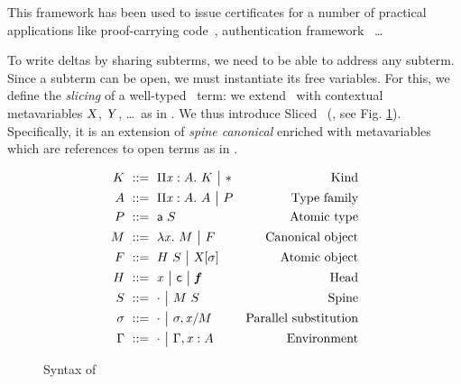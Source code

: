 \documentclass{llncs}
\begin{document}
This framework has been used to issue certificates for a number of
practical applications like proof-carrying
code~\cite{necula1997proof}, authentication
framework~\cite{appel1999proof} \ldots %

To write deltas by sharing subterms, we need to be able to address any
subterm. Since a subterm can be open, we must instantiate its free
variables. For this, we define the \emph{slicing} of a well-typed \LF\
term: we extend \LF\ with contextual metavariables $\text{\textsl{X}}$, $\text{\textsl{Y}}$, \ldots\ as in \cite{nanevski2008contextual}. We thus introduce
Sliced \LF\ (\SLF, see Fig. \ref{fig:syntax-LF}). Specifically, it is
an extension of \emph{spine canonical \LF} \cite{pfenning2007term}
enriched with metavariables which are references to open terms as in
\cite{nanevski2008contextual}.

\begin{figure}[t]
  \begin{align*}
    K &\ ::=\  \Pi{\ensuremath{\text{\textit{x}}}}:{A}.\  K \ {\big|}\  \mathsf{*} &
    \text{Kind}\\
    A &\ ::=\  \Pi{\ensuremath{\text{\textit{x}}}}:{A}.\  A \ {\big|}\  P &
    \text{Type family} \\
    P &\ ::=\  {\text{\textsf{a}}}\  S &
    \text{Atomic type} \\
    M &\ ::=\  \lambda{\ensuremath{\text{\textit{x}}}}.\  M \ {\big|}\  F &
    \text{Canonical object} \\
    F &\ ::=\  {H}\  S \ {\big|}\  {\text{\textsl{X}}}[{\sigma}] &
    \text{Atomic object} \\
    H &\ ::=\  \text{\textit{x}} \ {\big|}\  \text{\textsf{c}} \ {\big|}\  \text{\textit{\textbf{f}}} &
    \text{Head}\\
    S &\ ::=\  \cdot \ {\big|}\  {M}\ {S} &
    \text{Spine}\\
    \sigma &\ ::=\  \cdot \ {\big|}\  {\sigma},{{\text{\textit{x}}}/{M}} &
    \text{Parallel substitution} \\
    \Gamma &\ ::=\  \cdot \ {\big|}\  {\Gamma},{{\text{\textit{x}}}:{A}} &
    \text{Environment}
  \end{align*}
  \caption{Syntax of \SLF}
  \label{fig:syntax-LF}
\end{figure}
\end{document}
